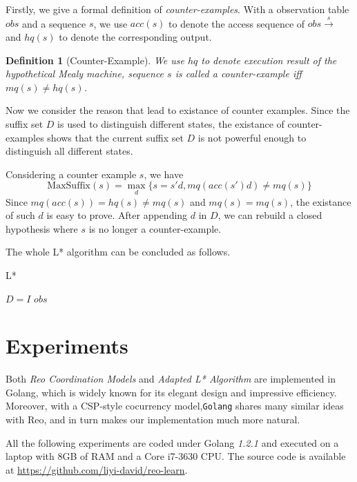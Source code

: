 \documentclass[conference, a4paper]{IEEEtran}
\newtheorem{definition}{Definition}
\begin{document}
Firstly, we give a formal definition of \emph{counter-examples}. With a observation table $obs$ and
a sequence $s$, we use $acc(s)$ to denote the access sequence of $obs\xrightarrow{s}$ and $hq(s)$ to
denote the corresponding output.

\begin{definition}[Counter-Example]
  We use $hq$ to denote execution result of the hypothetical Mealy machine, sequence $s$ is called a
  counter-example iff $mq(s)\neq hq(s)$.
\end{definition}

Now we consider the reason that lead to existance of counter examples. Since
the suffix set $D$ is used to distinguish different states, the existance of counter-examples
shows that the current suffix set $D$ is not powerful enough to distinguish all different states.

Considering a counter example $s$, we have
\[
\mbox{MaxSuffix}(s)=\max_d\{s=s'd, mq(acc(s')d)\neq mq(s)\}
\]
Since $mq(acc(s))=hq(s)\neq mq(s)$ and $mq(s) = mq(s)$, the existance of such $d$ is easy to prove.
After appending $d$ in $D$, we can rebuild a closed hypothesis where $s$ is no longer a
counter-example.

The whole L* algorithm can be concluded as follows.
\begin{algorithm} 
  \caption{L*} 
  \label{alg:lstar}
  $D=I$\;
  \Return $obs$\; 
\end{algorithm}




\section{Experiments} 
\label{sec:experiment}

Both \emph{Reo Coordination Models} and \emph{Adapted L* Algorithm} are implemented in
Golang\cite{golang}, which is widely known for its elegant design and impressive efficiency.
Moreover, with a CSP-style\cite{DBLP:books/ph/Hoare85} cocurrency model,\texttt{Golang} shares many
similar ideas with Reo, and in turn makes our implementation much more natural.

All the following experiments are coded under Golang \emph{1.2.1} and executed on a laptop with 8GB
of RAM and a Core i7-3630 CPU. The source code is available at
\url{https://github.com/liyi-david/reo-learn}.
\end{document}
